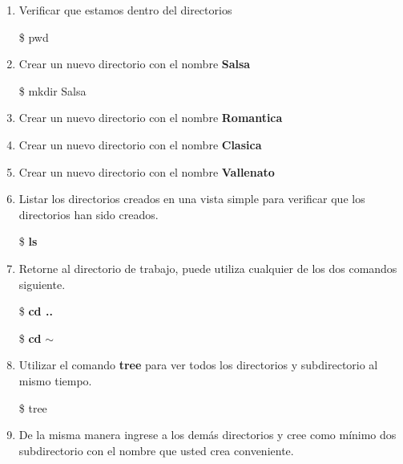 \documentclass[a4paper,12pt,spanish]{article}
\begin{document}
\begin{enumerate}
  \item Verificar que estamos dentro del directorios
 \begin{tcolorbox}[colback=red!5!white,colframe=red!75!black,fonttitle=\bfseries]
    \$ pwd
  \end{tcolorbox}
  
\item Crear un nuevo directorio con el nombre \textbf{Salsa}
  \begin{tcolorbox}[colback=red!5!white,colframe=red!75!black,fonttitle=\bfseries]
    \$ mkdir Salsa
  \end{tcolorbox}
  \item Crear un nuevo directorio con el nombre \textbf{Romantica}
  \item Crear un nuevo directorio con el nombre \textbf{Clasica}
  \item Crear un nuevo directorio con el nombre \textbf{Vallenato}
  \item Listar los directorios creados en una vista simple para
  verificar que los directorios han sido creados.
  \begin{tcolorbox}[colback=red!5!white,colframe=red!75!black,fonttitle=\bfseries]
    \$ \textbf{ls}
  \end{tcolorbox}
  \item Retorne al directorio de trabajo, puede utiliza cualquier de
  los dos comandos siguiente. \\
  
  \begin{minipage}[H]{0.5\linewidth}
  \begin{tcolorbox}[colback=red!5!white,colframe=red!75!black,fonttitle=\bfseries]
    \$ \textbf{cd ..}
  \end{tcolorbox}
  \end{minipage}
  \begin{minipage}[H]{0.5\linewidth}
  \begin{tcolorbox}[colback=red!5!white,colframe=red!75!black,fonttitle=\bfseries]
    \$ \textbf{cd} $\sim$
  \end{tcolorbox}
  \end{minipage}

  \item Utilizar el comando \textbf{tree} para ver todos los
  directorios y subdirectorio al mismo tiempo.
 \begin{tcolorbox}[colback=gray!5]
    \$ tree
   \end{tcolorbox}

   
   \item De la misma manera ingrese a los demás directorios y cree
   como mínimo dos subdirectorio con el nombre que usted crea
   conveniente.\\


\end{enumerate}
\end{document}
